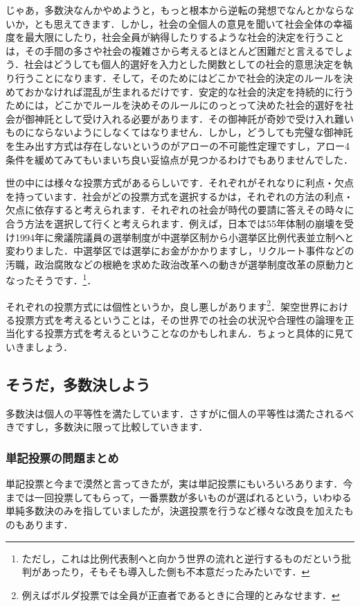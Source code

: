 じゃあ，多数決なんかやめようと，もっと根本から逆転の発想でなんとかならないか，とも思えてきます．しかし，社会の全個人の意見を聞いて社会全体の幸福度を最大限にしたり，社会全員が納得したりするような社会的決定を行うことは，その手間の多さや社会の複雑さから考えるとほとんど困難だと言えるでしょう．社会はどうしても個人的選好を入力とした関数としての社会的意思決定を執り行うことになります．そして，そのためにはどこかで社会的決定のルールを決めておかなければ混乱が生まれるだけです．安定的な社会的決定を持続的に行うためには，どこかでルールを決めそのルールにのっとって決めた社会的選好を社会が御神託として受け入れる必要があります．その御神託が奇妙で受け入れ難いものにならないようにしなくてはなりません．しかし，どうしても完璧な御神託を生み出す方式は存在しないというのがアローの不可能性定理ですし，アロー4条件を緩めてみてもいまいち良い妥協点が見つかるわけでもありませんでした．

世の中には様々な投票方式があるらしいです．それぞれがそれなりに利点・欠点を持っています．社会がどの投票方式を選択するかは，それぞれの方法の利点・欠点に依存すると考えられます．それぞれの社会が時代の要請に答えその時々に合う方法を選択して行くと考えられます．例えば，日本では55年体制の崩壊を受け1994年に衆議院議員の選挙制度が中選挙区制から小選挙区比例代表並立制へと変わりました．中選挙区では選挙にお金がかかりますし，リクルート事件などの汚職，政治腐敗などの根絶を求めた政治改革への動きが選挙制度改革の原動力となったそうです．\footnote{ただし，これは比例代表制へと向かう世界の流れと逆行するものだという批判があったり，そもそも導入した側も不本意だったみたいです．\footnotemark}．

それぞれの投票方式には個性というか，良し悪しがあります\footnote{例えばボルダ投票では全員が正直者であるときに合理的とみなせます．}．架空世界における投票方式を考えるということは，その世界での社会の状況や合理性の論理を正当化する投票方式を考えるということなのかもしれまん．ちょっと具体的に見ていきましょう．

\subsection{そうだ，多数決しよう}
多数決は個人の平等性を満たしています．さすがに個人の平等性は満たされるべきですし，多数決に限って比較していきます．

\subsubsection*{単記投票の問題まとめ}
単記投票と今まで漠然と言ってきたが，実は単記投票にもいろいろあります．今までは一回投票してもらって，一番票数が多いものが選ばれるという，いわゆる単純多数決のみを指していましたが，決選投票を行うなど様々な改良を加えたものもあります．

